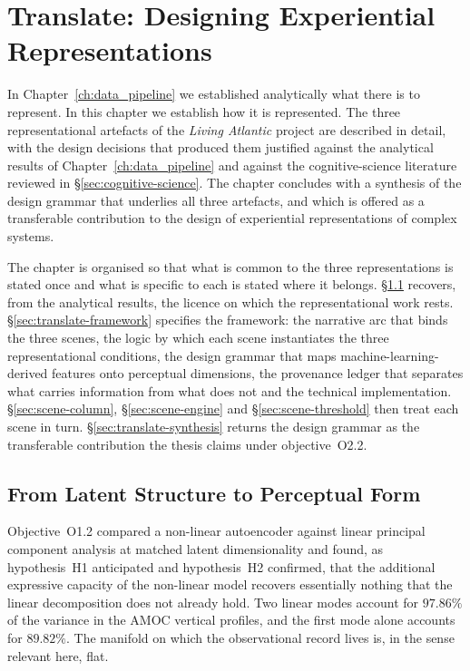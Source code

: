 
\chapter{Translate: Designing Experiential Representations}
\label{ch:translate}

In Chapter~\ref{ch:data_pipeline} we established analytically what there is to represent. In this chapter we establish how it is represented. The three representational artefacts of the \emph{Living Atlantic} project are described in detail, with the design decisions that produced them justified against the analytical results of Chapter~\ref{ch:data_pipeline} and against the cognitive-science literature reviewed in §\ref{sec:cognitive-science}. The chapter concludes with a synthesis of the design grammar that underlies all three artefacts, and which is offered as a transferable contribution to the design of experiential representations of complex systems.

The chapter is organised so that what is common to the three representations is stated once and what is specific to each is stated where it belongs. §\ref{sec:translate-premise} recovers, from the analytical results, the licence on which the representational work rests. §\ref{sec:translate-framework} specifies the framework: the narrative arc that binds the three scenes, the logic by which each scene instantiates the three representational conditions, the design grammar that maps machine-learning-derived features onto perceptual dimensions, the provenance ledger that separates what carries information from what does not and the technical implementation. §\ref{sec:scene-column}, §\ref{sec:scene-engine} and §\ref{sec:scene-threshold} then treat each scene in turn. §\ref{sec:translate-synthesis} returns the design grammar as the transferable contribution the thesis claims under objective~O2.2.

\section{From Latent Structure to Perceptual Form}
\label{sec:translate-premise}

Objective~O1.2 compared a non-linear autoencoder against linear principal component analysis at matched latent dimensionality and found, as hypothesis~H1 anticipated and hypothesis~H2 confirmed, that the additional expressive capacity of the non-linear model recovers essentially nothing that the linear decomposition does not already hold. Two linear modes account for $97.86\%$ of the variance in the AMOC vertical profiles, and the first mode alone accounts for $89.82\%$. The manifold on which the observational record lives is, in the sense relevant here, flat.

